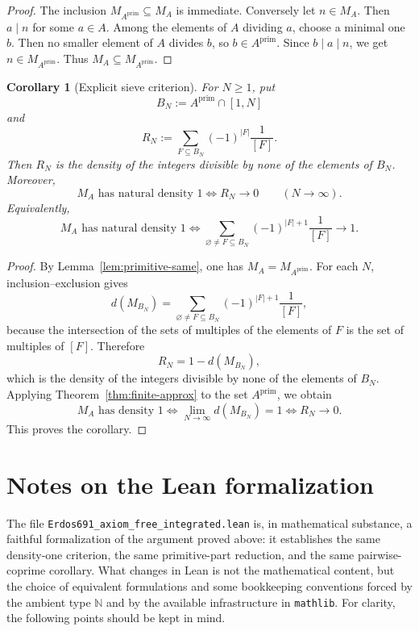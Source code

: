 \documentclass[11pt]{article}
\newtheorem{corollary}[theorem]{Corollary}
\theoremstyle{definition}
\theoremstyle{remark}
\newcommand{\PP}{A^{\mathrm{prim}}}
\begin{document}
\begin{proof}
The inclusion \(M_{\PP}\subseteq M_A\) is immediate.
Conversely let \(n\in M_A\).
Then \(a\mid n\) for some \(a\in A\).
Among the elements of \(A\) dividing \(a\), choose a minimal one \(b\).
Then no smaller element of \(A\) divides \(b\), so \(b\in \PP\).
Since \(b\mid a\mid n\), we get \(n\in M_{\PP}\).
Thus \(M_A\subseteq M_{\PP}\).
\end{proof}

\begin{corollary}[Explicit sieve criterion]\label{cor:sieve-criterion}
For \(N\ge 1\), put
\[
B_N:=\PP\cap[1,N]
\]
and
\[
R_N:=\sum_{F\subseteq B_N} (-1)^{|F|}\frac1{[F]}.
\]
Then \(R_N\) is the density of the integers divisible by none of the elements of \(B_N\).
Moreover,
\[
M_A\text{ has natural density }1
\iff
R_N\to 0
\qquad (N\to\infty).
\]
Equivalently,
\[
M_A\text{ has natural density }1
\iff
\sum_{\varnothing\neq F\subseteq B_N} (-1)^{|F|+1}\frac1{[F]}\to 1.
\]
\end{corollary}

\begin{proof}
By Lemma~\ref{lem:primitive-same}, one has \(M_A=M_{\PP}\).
For each \(N\), inclusion--exclusion gives
\[
d(M_{B_N})
=\sum_{\varnothing\neq F\subseteq B_N} (-1)^{|F|+1}\frac1{[F]},
\]
because the intersection of the sets of multiples of the elements of \(F\) is the set of multiples of \([F]\).
Therefore
\[
R_N=1-d(M_{B_N}),
\]
which is the density of the integers divisible by none of the elements of \(B_N\).
Applying Theorem~\ref{thm:finite-approx} to the set \(\PP\), we obtain
\[
M_A\text{ has density }1
\iff
\lim_{N\to\infty} d(M_{B_N})=1
\iff
R_N\to 0.
\]
This proves the corollary.
\end{proof}

\section*{Notes on the Lean formalization}

The file \texttt{Erdos691\_axiom\_free\_integrated.lean} is, in mathematical substance, a faithful formalization of the argument proved above: it establishes the same density-one criterion, the same primitive-part reduction, and the same pairwise-coprime corollary.
What changes in Lean is not the mathematical content, but the choice of equivalent formulations and some bookkeeping conventions forced by the ambient type \(\mathbb N\) and by the available infrastructure in \texttt{mathlib}.
For clarity, the following points should be kept in mind.
\end{document}
